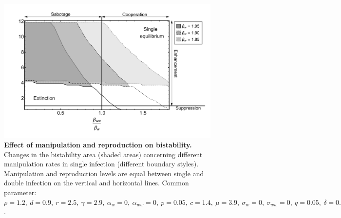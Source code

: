 \documentclass[11pt]{article}
\begin{document}
\begin{figure}[!ht]
	\includegraphics[width=\textwidth]{ratio_reproduction_manipulation_beta.pdf}
	\caption{\textbf{Effect of manipulation and reproduction on bistability.} Changes in the bistability area (shaded areas) concerning different manipulation rates in single infection (different boundary styles). 
			Manipulation and reproduction levels are equal between single and double infection on the vertical and horizontal lines. 
			Common parameter:  $\rho = 1.2, \ d = 0.9, \ r = 2.5, \ \gamma = 2.9, \ \alpha_w = 0, \ \alpha_{ww} = 0, \ p = 0.05, \ c = 1.4, \ \mu = 3.9, \ \sigma_w = 0, \ \sigma_{ww} = 0, \ q = 0.05, \ \delta = 0.9, \ k = 0.26, \  f_w = 35, h = 0.6$.} 
	\end{figure}

\clearpage



\end{document}
